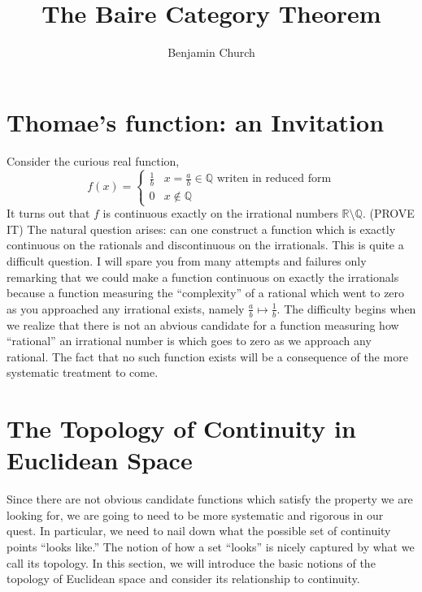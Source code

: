 \documentclass{article}
\newcommand{\Q}{\mathbb{Q}}
\newcommand{\R}{\mathbb{R}}
\theoremstyle{theorem}
\theoremstyle{definition}
\theoremstyle{definition}
\theoremstyle{remark}
\theoremstyle{definition}
\theoremstyle{remark}
\begin{document}
\author{Benjamin Church}
\title{\Huge The Baire Category Theorem}

\maketitle
\tableofcontents
\newpage

\newcommand{\Rcomp}{\hat{\R}^+}
\newcommand{\Power}[1]{\mathcal{P}\left( #1 \right)}
\newcommand{\measure}[1]{\mu\left( #1 \right)}
\newcommand{\outmeasure}[1]{\mu^*\left( #1 \right)}

\section{Thomae's function: an Invitation}

Consider the curious real function,
\[ f(x) = 
\begin{cases}
\frac{1}{b} & x = \frac{a}{b} \in \Q \text{ writen in reduced form} 
\\
0 & x \notin \Q
\end{cases}
\]
It turns out that $f$ is continuous exactly on the irrational numbers $\R \setminus \Q$. 
(PROVE IT)
The natural question arises: can one construct a function which is exactly continuous on the rationals and discontinuous on the irrationals. This is quite a difficult question. I will spare you from many attempts and failures only remarking that we could make a function continuous on exactly the irrationals because a function measuring the ``complexity'' of a rational which went to zero as you approached any irrational exists, namely $\frac{a}{b} \mapsto \frac{1}{b}$. The difficulty begins when we realize that there is not an abvious candidate for a function measuring how ``rational'' an irrational number is which goes to zero as we approach any rational. The fact that no such function exists will be a consequence of the more systematic treatment to come.

\section{The Topology of Continuity in Euclidean Space}

Since there are not obvious candidate functions which satisfy the property we are looking for, we are going to need to be more systematic and rigorous in our quest. In particular, we need to nail down what the possible set of continuity points ``looks like.'' The notion of how a set ``looks'' is nicely captured by what we call its topology. In this section, we will introduce the basic notions of the topology of Euclidean space and consider its relationship to continuity.  
\end{document}
